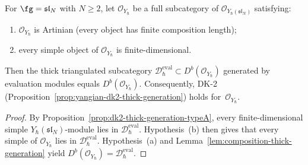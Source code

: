 \begin{theorem}
\label{thm:catO-thick-generation}
For $\fg = \mathfrak{sl}_N$ with $N \ge 2$, let
$\mathcal{O}_{Y_\hbar}$ be a full subcategory of
$\mathcal{O}_{Y_\hbar(\mathfrak{sl}_N)}$ satisfying:
\begin{enumerate}[label=\textup{(\alph*)}]
\item $\mathcal{O}_{Y_\hbar}$ is Artinian
  \textup{(}every object has finite composition length\textup{)};
\item every simple object of $\mathcal{O}_{Y_\hbar}$ is
  finite-dimensional.
\end{enumerate}
Then the thick triangulated subcategory
$\mathcal{D}_\hbar^{\mathrm{eval}} \subset
D^b(\mathcal{O}_{Y_\hbar})$
generated by evaluation modules equals
$D^b(\mathcal{O}_{Y_\hbar})$.
Consequently, DK-2
\textup{(}Proposition~\textup{\ref{prop:yangian-dk2-thick-generation}}\textup{)}
holds for~$\mathcal{O}_{Y_\hbar}$.
\end{theorem}

\begin{proof}
By Proposition~\ref{prop:dk2-thick-generation-typeA}, every
finite-dimensional simple $Y_\hbar(\mathfrak{sl}_N)$-module lies in
$\mathcal{D}_\hbar^{\mathrm{eval}}$.
Hypothesis~(b) then gives that every simple of
$\mathcal{O}_{Y_\hbar}$ lies in
$\mathcal{D}_\hbar^{\mathrm{eval}}$.
Hypothesis~(a) and Lemma~\ref{lem:composition-thick-generation}
yield $D^b(\mathcal{O}_{Y_\hbar}) =
\mathcal{D}_\hbar^{\mathrm{eval}}$.
\end{proof}

